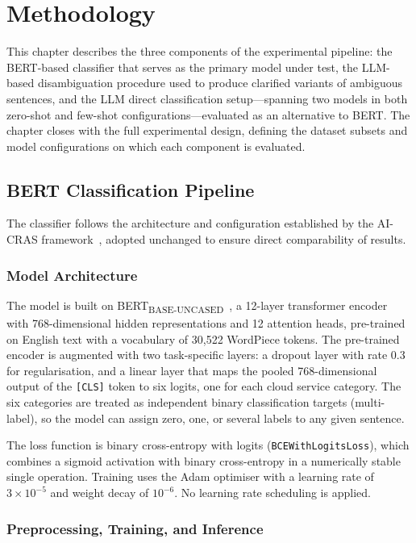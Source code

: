 \chapter{Methodology}

This chapter describes the three components of the experimental pipeline: the BERT-based classifier that serves as the primary model under test, the LLM-based disambiguation procedure used to produce clarified variants of ambiguous sentences, and the LLM direct classification setup—spanning two models in both zero-shot and few-shot configurations—evaluated as an alternative to BERT. The chapter closes with the full experimental design, defining the dataset subsets and model configurations on which each component is evaluated.

\section{BERT Classification Pipeline}

The classifier follows the architecture and configuration established by the AI-CRAS framework~\cite{casalicchio2024aicras}, adopted unchanged to ensure direct comparability of results.

\subsection{Model Architecture}

The model is built on BERT\textsubscript{BASE-UNCASED}~\cite{devlin2019bert}, a 12-layer transformer encoder with 768-dimensional hidden representations and 12 attention heads, pre-trained on English text with a vocabulary of 30,522 WordPiece tokens. The pre-trained encoder is augmented with two task-specific layers: a dropout layer with rate 0.3 for regularisation, and a linear layer that maps the pooled 768-dimensional output of the \texttt{[CLS]} token to six logits, one for each cloud service category. The six categories are treated as independent binary classification targets (multi-label), so the model can assign zero, one, or several labels to any given sentence.

The loss function is binary cross-entropy with logits (\texttt{BCEWithLogitsLoss}), which combines a sigmoid activation with binary cross-entropy in a numerically stable single operation. Training uses the Adam optimiser with a learning rate of $3\times10^{-5}$ and weight decay of $10^{-6}$. No learning rate scheduling is applied.

\subsection{Preprocessing, Training, and Inference}

